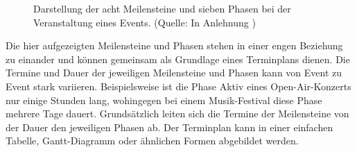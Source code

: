 \begin{figure}[H]
    \centering
    \setlength{\fboxsep}{10pt}
    \setlength{\fboxrule}{0.5pt}
    \caption[Eventmanagement: Meilensteine und Phase eines Events]{Darstellung der acht Meilensteine und sieben Phasen bei der Veranstaltung eines Events. (Quelle: In Anlehnung \autocite[]{Holzbaur.2002})} \label{fig:EM_PH_MS}
\end{figure}

Die hier aufgezeigten Meilensteine und Phasen stehen in einer engen Beziehung zu einander und können gemeinsam als Grundlage eines Terminplans dienen. Die Termine und Dauer der jeweiligen Meilensteine und Phasen kann von Event zu Event stark variieren. Beispielsweise ist die Phase Aktiv eines Open-Air-Konzerts nur einige Stunden lang, wohingegen bei einem Musik-Festival diese Phase mehrere Tage dauert. Grundsätzlich leiten sich die Termine der Meilensteine von der Dauer den jeweiligen Phasen ab. Der Terminplan kann in einer einfachen Tabelle, Gantt-Diagramm oder ähnlichen Formen abgebildet werden.